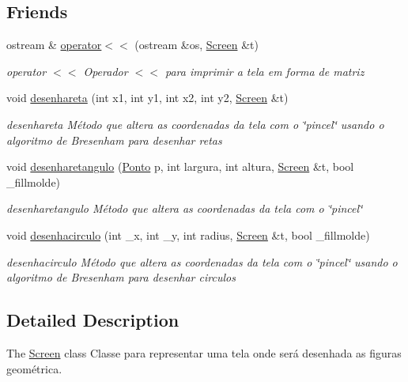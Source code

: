 \subsection*{Friends}
\begin{DoxyCompactItemize}
\item 
ostream \& \mbox{\hyperlink{class_screen_aab6a2880746bfe1b7964817cc8f0989e}{operator$<$$<$}} (ostream \&os, \mbox{\hyperlink{class_screen}{Screen}} \&t)
\begin{DoxyCompactList}\small\item\em operator $<$$<$ Operador $<$$<$ para imprimir a tela em forma de matriz \end{DoxyCompactList}\item 
void \mbox{\hyperlink{class_screen_adbcadcf484d39b99a5653dbb66ebc373}{desenhareta}} (int x1, int y1, int x2, int y2, \mbox{\hyperlink{class_screen}{Screen}} \&t)
\begin{DoxyCompactList}\small\item\em desenhareta Método que altera as coordenadas da tela com o \char`\"{}pincel\char`\"{} usando o algoritmo de Bresenham para desenhar retas \end{DoxyCompactList}\item 
void \mbox{\hyperlink{class_screen_a7528dc26ec23f8212f5a0748a09884f1}{desenharetangulo}} (\mbox{\hyperlink{class_ponto}{Ponto}} p, int largura, int altura, \mbox{\hyperlink{class_screen}{Screen}} \&t, bool \+\_\+fillmolde)
\begin{DoxyCompactList}\small\item\em desenharetangulo Método que altera as coordenadas da tela com o \char`\"{}pincel\char`\"{} \end{DoxyCompactList}\item 
void \mbox{\hyperlink{class_screen_adcbc719000bbfb8a9354328c32147ff2}{desenhacirculo}} (int \+\_\+x, int \+\_\+y, int radius, \mbox{\hyperlink{class_screen}{Screen}} \&t, bool \+\_\+fillmolde)
\begin{DoxyCompactList}\small\item\em desenhacirculo Método que altera as coordenadas da tela com o \char`\"{}pincel\char`\"{} usando o algoritmo de Bresenham para desenhar circulos \end{DoxyCompactList}\end{DoxyCompactItemize}


\subsection{Detailed Description}
The \mbox{\hyperlink{class_screen}{Screen}} class Classe para representar uma tela onde será desenhada as figuras geométrica. 

